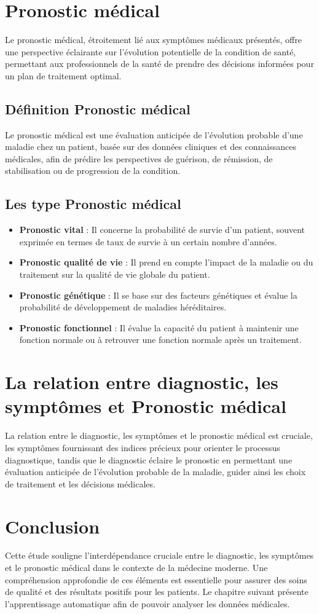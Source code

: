 \section{Pronostic médical }
Le pronostic médical, étroitement lié aux symptômes médicaux présentés, offre une perspective éclairante sur l'évolution potentielle de la condition de santé, permettant aux professionnels de la santé de prendre des décisions informées pour un plan de traitement optimal.
\subsection{Définition Pronostic médical  }
Le pronostic médical est une évaluation anticipée de l'évolution probable d'une maladie chez un patient, basée sur des données cliniques et des connaissances médicales, afin de prédire les perspectives de guérison, de rémission, de stabilisation ou de progression de la condition.
\subsection{Les type Pronostic médical }
\begin{itemize}
\item \textbf{Pronostic vital} : Il concerne la probabilité de survie d'un patient, souvent exprimée en termes de taux de survie à un certain nombre d'années.

\item \textbf{Pronostic qualité de vie} : Il prend en compte l'impact de la maladie ou du traitement sur la qualité de vie globale du patient.

\item \textbf{Pronostic génétique} : Il se base sur des facteurs génétiques et évalue la probabilité de développement de maladies héréditaires.

\item \textbf{Pronostic fonctionnel} : Il évalue la capacité du patient à maintenir une fonction normale ou à retrouver une fonction normale après un traitement.
\end{itemize}

\section{La relation entre diagnostic, les symptômes et Pronostic médical }
La relation entre le diagnostic, les symptômes et le pronostic médical est cruciale, les symptômes fournissant des indices précieux pour orienter le processus diagnostique, tandis que le diagnostic éclaire le pronostic en permettant une évaluation anticipée de l'évolution probable de la maladie, guider ainsi les choix de traitement et les décisions médicales.
\section{Conclusion}
Cette étude souligne l'interdépendance cruciale entre le diagnostic, les symptômes et le pronostic médical dans le contexte de la médecine moderne. Une compréhension approfondie de ces éléments est essentielle pour assurer des soins de qualité et des résultats positifs pour les patients. 
Le chapitre suivant présente l’apprentissage automatique afin de pouvoir analyser les données médicales.
